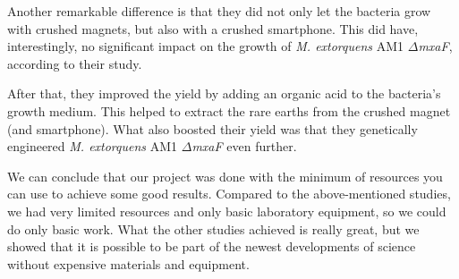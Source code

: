 Another remarkable difference is that they did not only let the bacteria grow with crushed magnets, but also with a crushed smartphone.
This did have, interestingly, no significant impact on the growth of \emph{M. extorquens} AM1 \(\Delta\)\emph{mxaF}, according to their study.

After that, they improved the yield by adding an organic acid to the bacteria's growth medium.
This helped to extract the rare earths from the crushed magnet (and smartphone).
What also boosted their yield was that they genetically engineered \emph{M. extorquens} AM1 \(\Delta\)\emph{mxaF} even further.

We can conclude that our project was done with the minimum of resources you can use to achieve some good results.
Compared to the above-mentioned studies, we had very limited resources and only basic laboratory equipment, so we could do only basic work.
What the other studies achieved is really great, but we showed that it is possible to be part of the newest developments of science without expensive materials and equipment.